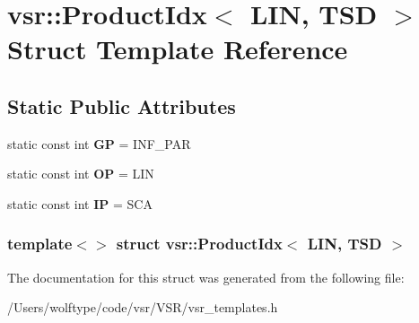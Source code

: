 \hypertarget{structvsr_1_1_product_idx_3_01_l_i_n_00_01_t_s_d_01_4}{\section{vsr\-:\-:Product\-Idx$<$ L\-I\-N, T\-S\-D $>$ Struct Template Reference}
\label{structvsr_1_1_product_idx_3_01_l_i_n_00_01_t_s_d_01_4}
}
\subsection*{Static Public Attributes}
\begin{DoxyCompactItemize}
\item 
\hypertarget{structvsr_1_1_product_idx_3_01_l_i_n_00_01_t_s_d_01_4_a8c7c48c6ab19f1e6b007be4d7458ce8a}{static const int {\bfseries G\-P} = I\-N\-F\-\_\-\-P\-A\-R}\label{structvsr_1_1_product_idx_3_01_l_i_n_00_01_t_s_d_01_4_a8c7c48c6ab19f1e6b007be4d7458ce8a}

\item 
\hypertarget{structvsr_1_1_product_idx_3_01_l_i_n_00_01_t_s_d_01_4_a80a2fdad01a9cac8532ba06385b7a1c7}{static const int {\bfseries O\-P} = L\-I\-N}\label{structvsr_1_1_product_idx_3_01_l_i_n_00_01_t_s_d_01_4_a80a2fdad01a9cac8532ba06385b7a1c7}

\item 
\hypertarget{structvsr_1_1_product_idx_3_01_l_i_n_00_01_t_s_d_01_4_a91924346a47758a62b7bae1c3a9b095d}{static const int {\bfseries I\-P} = S\-C\-A}\label{structvsr_1_1_product_idx_3_01_l_i_n_00_01_t_s_d_01_4_a91924346a47758a62b7bae1c3a9b095d}

\end{DoxyCompactItemize}
\subsubsection*{template$<$$>$ struct vsr\-::\-Product\-Idx$<$ L\-I\-N, T\-S\-D $>$}



The documentation for this struct was generated from the following file\-:\begin{DoxyCompactItemize}
\item 
/\-Users/wolftype/code/vsr/\-V\-S\-R/vsr\-\_\-templates.\-h\end{DoxyCompactItemize}
